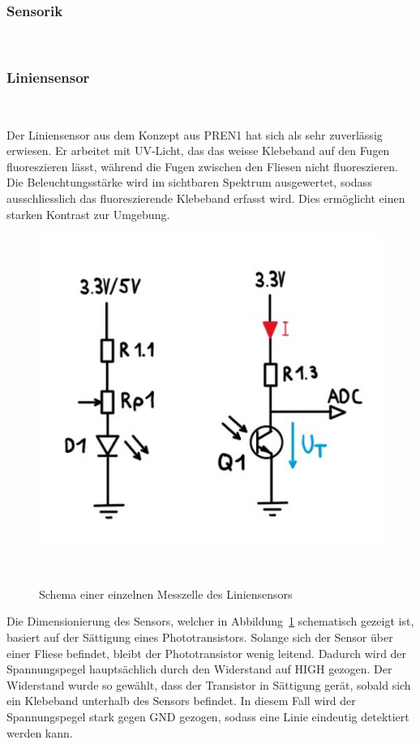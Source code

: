 \documentclass[main.tex]{subfiles} %
\begin{document}

\subsubsection{Sensorik}~\label{sec:Sensorik}

\subsubsection*{Liniensensor}~\label{sec:Sensorik_Liniensensor}

Der Liniensensor aus dem Konzept aus PREN1 hat sich als sehr zuverlässig
erwiesen. Er arbeitet mit UV-Licht, das das weisse Klebeband auf den Fugen
fluoreszieren lässt, während die Fugen zwischen den Fliesen nicht
fluoreszieren. Die Beleuchtungsstärke wird im sichtbaren Spektrum ausgewertet,
sodass ausschliesslich das fluoreszierende Klebeband erfasst wird. Dies
ermöglicht einen starken Kontrast zur Umgebung.

\begin{figure}[H]
  \centering
  \includegraphics[width =
  0.5\linewidth]{./fig_Antriebsregelung_Firmware/Schema_Messzelle_Liniensensor.pdf}
  \caption{Schema einer einzelnen Messzelle des
  Liniensensors}~\label{fig:Schema_Messtelle_Liniensensor}
\end{figure}

Die Dimensionierung des Sensors, welcher in
Abbildung~\ref{fig:Schema_Messtelle_Liniensensor} schematisch gezeigt ist,
basiert auf der Sättigung eines Phototransistors. Solange sich der Sensor über
einer Fliese befindet, bleibt der Phototransistor wenig leitend. Dadurch wird
der Spannungspegel hauptsächlich durch den Widerstand auf HIGH gezogen. Der
Widerstand wurde so gewählt, dass der Transistor in Sättigung gerät, sobald
sich ein Klebeband unterhalb des Sensors befindet. In diesem Fall wird der
Spannungspegel stark gegen GND gezogen, sodass eine Linie eindeutig detektiert
werden kann.
\end{document}
